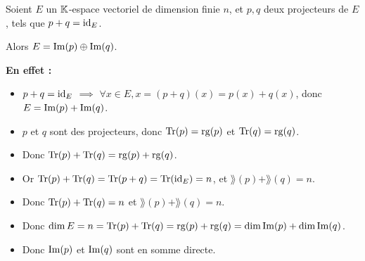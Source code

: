 \documentclass[12pt, a4paper]{report}
\begin{document}
\begin{application}
    Soient $E$ un $\mathbb{K}$-espace vectoriel de dimension finie $n$, et $p,q$ deux projecteurs de $E$, tels que $p+q = \mathrm{id}_E$.

    Alors $E = \mathrm{Im}(p) \oplus \mathrm{Im}(q)$.

    \textbf{En effet :}
    \begin{itemize}
        \item $p+q = \mathrm{id}_E$ $\implies$ $\forall x \in E, x = (p+q)(x) = p(x) + q(x)$, donc $E = \mathrm{Im}(p) + \mathrm{Im}(q)$.
        \item $p$ et $q$ sont des projecteurs, donc $\mathrm{Tr}(p) = \mathrm{rg}(p)$ et $\mathrm{Tr}(q) = \mathrm{rg}(q)$.
        \item Donc $\mathrm{Tr}(p) + \mathrm{Tr}(q) = \mathrm{rg}(p) + \mathrm{rg}(q)$.
        \item Or $\mathrm{Tr}(p) + \mathrm{Tr}(q) = \mathrm{Tr}(p+q) = \mathrm{Tr}(\mathrm{id}_E) = n$, et $\rang(p) + \rang(q) = n$.
        \item Donc $\mathrm{Tr}(p) + \mathrm{Tr}(q) = n$ et $\rang(p) + \rang(q) = n$.
        \item Donc $\dim E = n = \mathrm{Tr}(p) + \mathrm{Tr}(q) = \mathrm{rg}(p) + \mathrm{rg}(q) = \dim \mathrm{Im}(p) + \dim \mathrm{Im}(q)$.
        \item Donc $\mathrm{Im}(p)$ et $\mathrm{Im}(q)$ sont en somme directe.
    \end{itemize}
\end{application}
\end{document}
